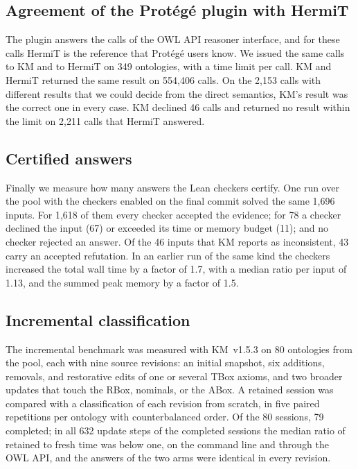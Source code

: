 \subsection{Agreement of the Prot\'eg\'e plugin with HermiT}
\label{sec:eval-parity}

The plugin answers the calls of the OWL API reasoner interface, and for these
calls HermiT is the reference that Prot\'eg\'e users know.  We issued the same
calls to KM and to HermiT on 349 ontologies, with a time limit per call.  KM
and HermiT returned
the same result on 554,406 calls.  On the 2,153 calls with different results
that we could decide from the direct semantics, KM's result was the correct
one in every case.  KM declined 46 calls and returned no result within the limit on 2,211 calls
that HermiT answered.

\subsection{Certified answers}
\label{sec:eval-cert}

Finally we measure how many answers the Lean checkers certify.  One run over
the pool with the checkers enabled on the final commit solved the same 1,696
inputs.  For 1,618 of them every checker accepted the evidence; for 78 a
checker declined the input (67) or exceeded its time or memory budget (11);
and no checker rejected an answer.  Of the 46 inputs that KM reports as
inconsistent, 43 carry an accepted refutation.  In an earlier run of the same
kind the checkers increased the total wall time by a factor of 1.7, with a
median ratio per input of 1.13, and the summed peak memory by a factor of 1.5.

\subsection{Incremental classification}
\label{sec:eval-incremental}

The incremental benchmark was measured with KM~v1.5.3 on 80 ontologies from
the pool, each with nine source revisions: an initial snapshot, six additions,
removals, and restorative edits of one or several TBox axioms, and two broader
updates that touch the RBox, nominals, or the ABox.  A retained session was
compared with a classification of each revision from scratch, in five paired
repetitions per ontology with counterbalanced order.  Of the 80 sessions, 79
completed; in all 632 update steps of the completed sessions the median ratio
of retained to fresh time was below one, on the command line and through the
OWL API, and the answers of the two arms were identical in every revision.

